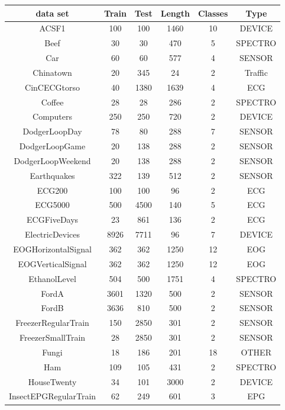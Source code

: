 \begin{table}
\begin{center}
\begin{longtable}{||c|c|c|c|c|c||}
 \hline
  data set & Train & Test & Length & Classes & Type \\ [0.5ex]
 \hline\hline
 ACSF1 & 100 & 100 & 1460 & 10 & DEVICE \\[1ex]
 \hline
 Beef & 30 & 30 & 470 & 5 & SPECTRO \\[1ex]
 \hline
 Car & 60 & 60 & 577 & 4 & SENSOR \\[1ex]
 \hline
 Chinatown & 20 & 345 & 24 & 2 & Traffic \\[1ex]
 \hline
 CinCECGtorso & 40 & 1380 & 1639 & 4 & ECG \\[1ex]
 \hline
 Coffee & 28 & 28 & 286 & 2 & SPECTRO \\[1ex]
 \hline
 Computers & 250 & 250 & 720 & 2 & DEVICE \\[1ex]
 \hline
 DodgerLoopDay & 78 & 80 & 288 & 7 & SENSOR \\[1ex]
 \hline
 DodgerLoopGame & 20 & 138 & 288 & 2 & SENSOR \\[1ex]
 \hline
 DodgerLoopWeekend & 20 & 138 & 288 & 2 & SENSOR \\[1ex]
 \hline
 Earthquakes & 322 & 139 & 512 & 2 & SENSOR \\[1ex]
 \hline
 ECG200 & 100 & 100 & 96 & 2 & ECG \\[1ex]
 \hline
 ECG5000 & 500 & 4500 & 140 & 5 & ECG \\[1ex]
 \hline
 ECGFiveDays & 23 & 861 & 136 & 2 & ECG \\[1ex]
 \hline
 ElectricDevices & 8926 & 7711 & 96 & 7 & DEVICE \\[1ex]
 \hline
 EOGHorizontalSignal & 362 & 362 & 1250 & 12 & EOG \\[1ex]
 \hline
 EOGVerticalSignal & 362 & 362 & 1250 & 12 & EOG \\[1ex]
 \hline
 EthanolLevel & 504 & 500 & 1751 & 4 & SPECTRO \\[1ex]
 \hline
 FordA & 3601 & 1320 & 500 & 2 & SENSOR \\[1ex]
 \hline
 FordB & 3636 & 810 & 500 & 2 & SENSOR \\[1ex]
 \hline
 FreezerRegularTrain & 150 & 2850 & 301 & 2 & SENSOR \\[1ex]
 \hline
 FreezerSmallTrain & 28 & 2850 & 301 & 2 & SENSOR \\[1ex]
 \hline
 Fungi & 18 & 186 & 201 & 18 & OTHER \\[1ex]
 \hline
 Ham & 109 & 105 & 431 & 2 & SPECTRO \\[1ex]
 \hline
 HouseTwenty & 34 & 101 & 3000 & 2 & DEVICE \\[1ex]
 \hline
 InsectEPGRegularTrain & 62 & 249 & 601 & 3 & EPG \\[1ex]

\end{longtable}
\end{center}
\end{table}
